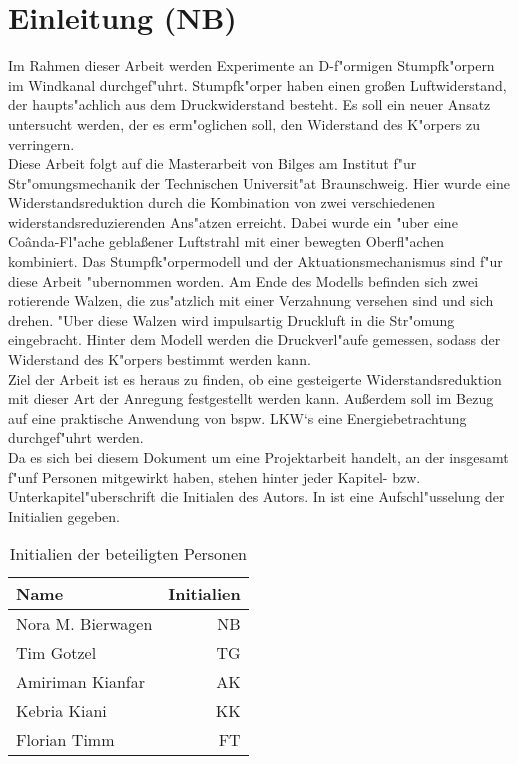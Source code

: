 \chapter{Einleitung (NB)}\label{s:einleitung}
Im Rahmen dieser Arbeit werden Experimente an D-f"ormigen Stumpfk"orpern im Windkanal durchgef"uhrt. Stumpfk"orper haben einen gro\ss{}en Luftwiderstand, der haupts"achlich aus dem Druckwiderstand besteht. Es soll ein neuer Ansatz untersucht werden, der es erm"oglichen soll, den Widerstand des K"orpers zu verringern.\\
Diese Arbeit folgt auf die Masterarbeit \cite{Bilges.2018} von Bilges am Institut f"ur Str"omungsmechanik der Technischen Universit"at Braunschweig. Hier wurde eine Widerstandsreduktion durch die Kombination von zwei verschiedenen widerstandsreduzierenden Ans"atzen erreicht. Dabei wurde ein "uber eine Co\^{a}nda-Fl"ache gebla\ss{}ener Luftstrahl mit einer bewegten Oberfl"achen kombiniert. Das Stumpfk"orpermodell und der Aktuationsmechanismus sind f"ur diese Arbeit "ubernommen worden. Am Ende des Modells befinden sich zwei rotierende Walzen, die zus"atzlich mit einer Verzahnung versehen sind und sich drehen. "Uber diese Walzen wird impulsartig Druckluft in die Str"omung eingebracht. Hinter dem Modell werden die Druckverl"aufe gemessen, sodass der Widerstand des K"orpers bestimmt werden kann.\\
Ziel der Arbeit ist es heraus zu finden, ob eine gesteigerte Widerstandsreduktion mit dieser Art der Anregung festgestellt werden kann. Au\ss{}erdem soll im Bezug auf eine praktische Anwendung von bspw. LKW`s eine Energiebetrachtung durchgef"uhrt werden.\\
Da es sich bei diesem Dokument um eine Projektarbeit handelt, an der insgesamt f"unf Personen mitgewirkt haben, stehen hinter jeder Kapitel- bzw. Unterkapitel"uberschrift die Initialen des Autors. In  ist eine Aufschl"usselung der Initialien gegeben.

\begin{table}[h]
	\centering
	\begin{tabular}{lr}
		\toprule
		Name & Initialien\\
		\midrule
		Nora M. Bierwagen & NB\\
		Tim Gotzel & TG\\
		Amiriman Kianfar & AK\\
		Kebria Kiani & KK\\
		Florian Timm & FT\\
		\bottomrule
	\end{tabular}
	\caption{Initialien der beteiligten Personen}
	\label{tab:initialien}
\end{table}
